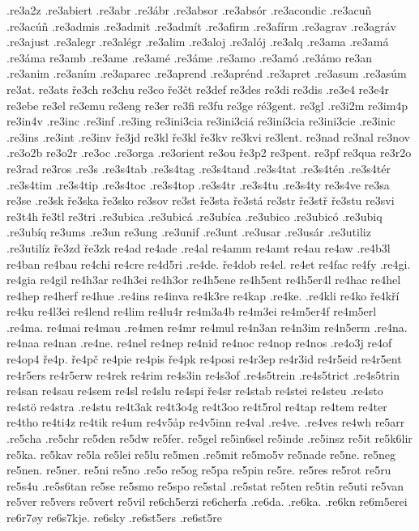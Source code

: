 {{.re3a2z
.re3abiert
.re3abr
.re3ábr
.re3absor
.re3absór
.re3acondic
.re3acuñ
.re3acúñ
.re3admis
.re3admit
.re3admít
.re3afirm
.re3afírm
.re3agrav
.re3agráv
.re3ajust
.re3alegr
.re3alégr
.re3alim
.re3aloj
.re3alój
.re3alq
.re3ama
.re3amá
.re3áma
re3amb
.re3ame
.re3amé
.re3áme
.re3amo
.re3amó
.re3ámo
re3an
.re3anim
.re3aním
.re3aparec
.re3aprend
.re3aprénd
.re3apret
.re3asum
.re3asúm
re3at.
re3ats
ře3ch
re3chu
re3co
ře3čt
re3def
re3des
re3di
re3dis
.re3e4
re3e4r
re3ebe
re3el
re3emu
re3eng
re3er
re3fi
re3fu
re3ge
ré3gent.
re3gl
.re3i2m
re3im4p
re3in4v
.re3inc
.re3inf
.re3ing
re3ini3cia
re3ini3ciá
re3iní3cia
re3ini3cie
.re3inic
.re3ins
.re3int
.re3inv
ře3jd
re3kl
ře3kl
ře3kv
re3kvi
re3lent.
re3nad
re3nal
re3nov
.re3o2b
re3o2r
.re3oc
.re3orga
.re3orient
re3ou
ře3p2
re3pent.
re3pf
re3qua
re3r2o
re3rad
re3ros
.re3s
.re3s4tab
.re3s4tag
.re3s4tand
.re3s4tat
.re3s4tén
.re3s4tér
.re3s4tim
.re3s4tip
.re3s4toc
.re3s4top
.re3s4tr
.re3s4tu
.re3s4ty
re3s4ve
re3sa
re3se
.re3sk
ře3ska
ře3sko
re3sov
re3st
ře3sta
ře3stá
re3str
ře3stř
ře3stu
re3svi
re3t4h
ře3tl
re3tri
.re3ubica
.re3ubicá
.re3ubíca
.re3ubico
.re3ubicó
.re3ubiq
.re3ubíq
re3ums
.re3un
re3ung
.re3unif
.re3unt
.re3usar
.re3usár
.re3utiliz
.re3utilíz
ře3zd
ře3zk
re4ad
re4ade
.re4al
re4amm
re4amt
re4au
re4aw
.re4b3l
re4ban
re4bau
re4chi
re4cre
re4d5ri
.re4de.
ře4dob
re4el.
re4et
re4fac
re4fy
.re4gi.
re4gia
re4gil
re4h3ar
re4h3ei
re4h3or
re4h5ene
re4h5ent
re4h5er4l
re4hac
re4hel
re4hep
re4herf
re4hue
.re4ins
re4inva
re4k3re
re4kap
.re4ke.
.re4kli
re4ko
ře4kří
re4ku
re4l3ei
re4lend
re4lim
re4lu4r
re4m3a4b
re4m3ei
re4m5er4f
re4m5erl
.re4ma.
re4mai
re4mau
.re4men
re4mr
re4mul
re4n3an
re4n3im
re4n5erm
.re4na.
re4naa
re4nan
.re4ne.
re4nel
re4nep
re4nid
re4noc
re4nop
re4nos
.re4o3j
re4of
re4op4
ře4p.
ře4pč
re4pie
re4pis
ře4pk
re4posi
re4r3ep
re4r3id
re4r5eid
re4r5ent
re4r5ers
re4r5erw
re4rek
re4rim
re4s3in
re4s3of
.re4s5trein
.re4s5trict
.re4s5trin
re4san
re4sau
re4sem
re4sl
re4slu
re4spi
ře4sr
re4stab
re4stei
re4steu
.re4sto
re4stö
re4stra
.re4stu
re4t3ak
re4t3o4g
re4t3oo
re4t5rol
re4tap
re4tem
re4ter
re4tho
re4ti4z
re4tik
re4um
re4v5åp
re4v5inn
re4val
.re4ve.
.re4ves
re4wh
re5arr
.re5cha
.re5chr
re5den
re5dw
re5fer.
re5gel
re5in6sel
re5inde
.re5insz
re5it
re5k6lir
re5ka.
re5kav
re5la
re5lei
re5lu
re5men
.re5mit
re5mo5v
re5nade
re5ne.
re5neg
re5nen.
re5ner.
re5ni
re5no
.re5o
re5og
re5pa
re5pin
re5re.
re5res
re5rot
re5ru
re5s4u
.re5s6tan
re5se
re5smo
re5spo
re5stal
.re5stat
re5ten
re5tin
re5uti
re5van
re5ver
re5vers
re5vert
re5vil
re6ch5erzi
re6cherfa
.re6da.
.re6ka.
.re6kn
re6m5erei
re6r7øy
re6s7kje.
re6sky
.re6st5ers
.re6st5re
}}
